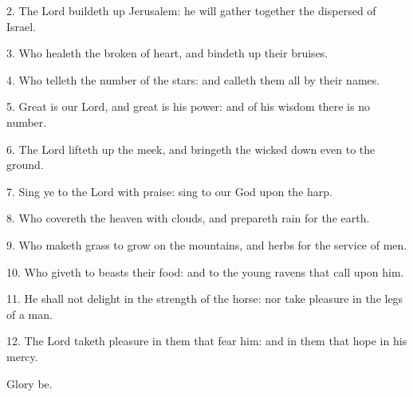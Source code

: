 
2. The Lord buildeth up Jerusalem: he will gather together the dispersed of Israel.

3. Who healeth the broken of heart, and bindeth up their bruises.

4. Who telleth the number of the stars: and calleth them all by their names.

5. Great is our Lord, and great is his power: and of his wisdom there is no number.

6. The Lord lifteth up the meek, and bringeth the wicked down even to the ground.

7. Sing ye to the Lord with praise: sing to our God upon the harp.

8. Who covereth the heaven with clouds, and prepareth rain for the earth.

9. Who maketh grass to grow on the mountains, and herbs for the service of men.

10. Who giveth to beasts their food: and to the young ravens that call upon him.

11. He shall not delight in the strength of the horse: nor take pleasure in the legs of a man.

12. The Lord taketh pleasure in them that fear him: and in them that hope in his mercy. 

Glory be.